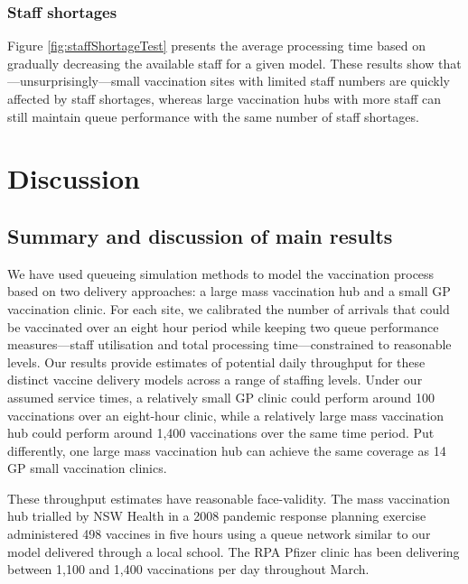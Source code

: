 \documentclass{article}
\begin{document}
\hypertarget{staff-shortages}{%
\subsubsection{Staff shortages}\label{staff-shortages}}

Figure \ref{fig:staffShortageTest} presents the average processing time
based on gradually decreasing the available staff for a given model.
These results show that---unsurprisingly---small vaccination sites with
limited staff numbers are quickly affected by staff shortages, whereas
large vaccination hubs with more staff can still maintain queue
performance with the same number of staff shortages.

\hypertarget{discussion}{%
\section{Discussion}\label{discussion}}

\hypertarget{summary-and-discussion-of-main-results}{%
\subsection{Summary and discussion of main
results}\label{summary-and-discussion-of-main-results}}

We have used queueing simulation methods to model the vaccination
process based on two delivery approaches: a large mass vaccination hub
and a small GP vaccination clinic. For each site, we calibrated the
number of arrivals that could be vaccinated over an eight hour period
while keeping two queue performance measures---staff utilisation and
total processing time---constrained to reasonable levels. Our results
provide estimates of potential daily throughput for these distinct
vaccine delivery models across a range of staffing levels. Under our
assumed service times, a relatively small GP clinic could perform around
100 vaccinations over an eight-hour clinic, while a relatively large
mass vaccination hub could perform around 1,400 vaccinations over the
same time period. Put differently, one large mass vaccination hub can
achieve the same coverage as 14 GP small vaccination clinics.

These throughput estimates have reasonable face-validity. The mass
vaccination hub trialled by NSW Health in a 2008 pandemic response
planning exercise administered 498 vaccines in five hours using a queue
network similar to our model delivered through a local school. The RPA
Pfizer clinic has been delivering between 1,100 and 1,400 vaccinations
per day throughout March.
\end{document}
